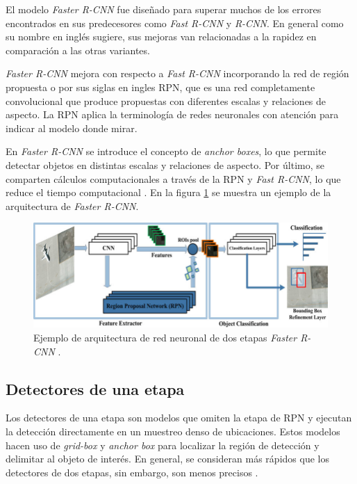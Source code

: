 El modelo \textit{Faster R-CNN} fue diseñado para superar muchos de los errores encontrados en sus predecesores como \textit{Fast R-CNN} y \textit{R-CNN}. En general como su nombre en inglés sugiere, sus mejoras van relacionadas a la rapidez en comparación a las otras variantes.

\textit{Faster R-CNN} mejora con respecto a \textit{Fast R-CNN} incorporando la red de región propuesta o por sus siglas en ingles RPN, que es una red completamente convolucional que produce propuestas con diferentes escalas y relaciones de aspecto. La RPN aplica la terminología de redes neuronales con atención para indicar al modelo donde mirar.

En \textit{Faster R-CNN} se introduce el concepto de \textit{anchor boxes}, lo que permite detectar objetos en distintas escalas y relaciones de aspecto. Por último, se comparten cálculos computacionales a través de la RPN y \textit{Fast R-CNN}, lo que reduce el tiempo computacional \cite{ARTICLE:9}. En la figura \ref{fig:Faster-rcnn} se muestra un ejemplo de la arquitectura de \textit{Faster R-CNN}.

\begin{figure}[ht]
	\centering
	\includegraphics[scale=1.3]{./Figures/Faster-rcnn.png}
	\caption{Ejemplo de arquitectura de red neuronal de dos etapas \textit{Faster R-CNN} \cite{ARTICLE:11}.}
	\label{fig:Faster-rcnn}
\end{figure}

\subsection{Detectores de una etapa}

Los detectores de una etapa son modelos que omiten la etapa de RPN y ejecutan la detección directamente en un muestreo denso de ubicaciones. Estos modelos hacen uso de \textit{grid-box} y \textit{anchor box} para localizar la región de detección y delimitar al objeto de interés. En general, se consideran más rápidos que los detectores de dos etapas, sin embargo, son menos precisos \cite{ARTICLE:12}.

